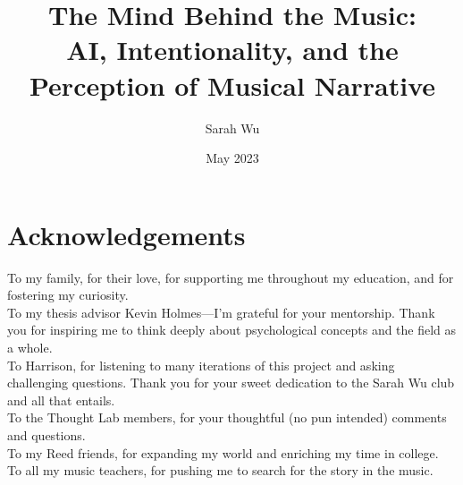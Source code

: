 \documentclass[12pt,twoside]{reedthesis}
\title{The Mind Behind the Music: \\AI, Intentionality, and the Perception of Musical Narrative}
\author{Sarah Wu}
\date{May 2023}
\begin{document}
  \maketitle
  \frontmatter %
  \pagestyle{empty} %

    \chapter*{Acknowledgements}
	To my family, for their love, for supporting me throughout my education, and for fostering my curiosity. 
	\\

	\noindent To my thesis advisor Kevin Holmes—I'm grateful for your mentorship. Thank you for inspiring me to think deeply about psychological concepts and the field as a whole. 
	\\

	\noindent To Harrison, for listening to many iterations of this project and asking challenging questions. Thank you for your sweet dedication to the Sarah Wu club and all that entails. 
	\\

	\noindent To the Thought Lab members, for your thoughtful (no pun intended) comments and questions. 
	\\

	\noindent To my Reed friends, for expanding my world and enriching my time in college. 
	\\

	\noindent To all my music teachers, for pushing me to search for the story in the music.
	

	
	

\end{document}
